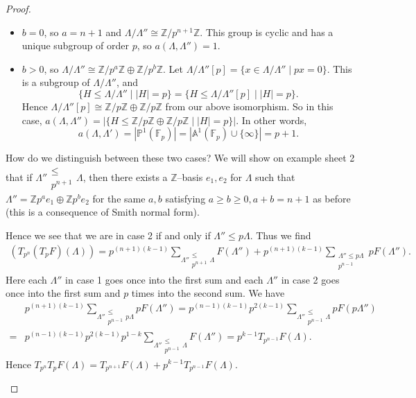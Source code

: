 \documentclass{article}
\theoremstyle{definition}
\begin{document}
\begin{proof}
\begin{enumerate}[(1)]
        \begin{itemize}
            \item $b = 0$, so $a = n+1$ and $\Lambda/\Lambda'' \cong \mathbb{Z}/p^{n+1}\mathbb{Z}$. This group is cyclic and has a unique subgroup of order $p$, so $a(\Lambda,\Lambda'') = 1$.
            \item $b>0$, so $\Lambda/\Lambda'' \cong \mathbb{Z}/p^a \mathbb{Z} \oplus \mathbb{Z}/p^b \mathbb{Z}$. Let $\Lambda/\Lambda''[p] = \{x \in \Lambda/\Lambda'' \mid px = 0\}$. This is a subgroup of $\Lambda/\Lambda''$, and \[
            \{H \le \Lambda/\Lambda'' \mid |H| = p\}  = \{H \le \Lambda/\Lambda''[p] \mid  |H| = p\}.
            \]
            Hence $\Lambda/\Lambda''[p] \cong \mathbb{Z}/p\mathbb{Z} \oplus \mathbb{Z}/p\mathbb{Z}$ from our above isomorphism. So in this case, $a(\Lambda,\Lambda'')  = |\{H \le \mathbb{Z}/p\mathbb{Z} \oplus \mathbb{Z}/p\mathbb{Z} \mid |H|= p\}|$. In other words, \[
            a(\Lambda,\Lambda') = |\mathbb{P}^1(\mathbb{F}_p)| = |\mathbb{A}^1(\mathbb{F}_p) \cup \{\infty\}| = p+1.
            \]
        \end{itemize} 
        How do we distinguish between these two cases? We will show on example sheet 2 that if $\Lambda'' \substack{\le \\ p^{n+1}}\Lambda$, then there exists a $\mathbb{Z}$--basis $e_1, e_2$ for $\Lambda$ such that $\Lambda'' = \mathbb{Z}p^a e_1 \oplus \mathbb{Z} p^b e_2$ for the same $a,b$ satisfying $a\ge b\ge 0, a+b = n+1$ as before (this is a consequence of Smith normal form).
        \vspace{1mm}
         
        Hence we see that we are in case 2 if and only if $\Lambda'' \le p \Lambda$. Thus we find
        \begin{align*}
            (T_{p^n}(T_pF)(\Lambda)) = p^{(n+1)(k-1)}\sum_{\Lambda'' \substack{\le \\ p^{n+1}}\Lambda} F(\Lambda'') + p^{(n+1)(k-1)} \sum_{\substack{ \Lambda''\le p \Lambda\\p^{n-1} } }^{} pF(\Lambda'').
        \end{align*}
        Here each $\Lambda''$ in case 1 goes once into the first sum and each $\Lambda''$ in case 2 goes once into the first sum and $p$ times into the second sum. We have 
        \begin{align*}
            &p^{(n+1)(k-1)} \sum_{\Lambda'' \substack{\le \\p^{n-1}} p \Lambda} p F(\Lambda'') = p^{(n-1)(k-1)}p^{2(k-1)}\sum_{\Lambda'' \substack{\le \\ p^{n-1}}\Lambda} p F(p \Lambda'') \\
            =& p^{(n-1)(k-1)}p^{2(k-1)}p^{1-k}\sum_{\Lambda'' \substack{\le \\ p^{n-1}}\Lambda} F(\Lambda'') = p^{k-1}T_{p^{n-1}}F(\Lambda).
        \end{align*}
        Hence $T_{p^n}T_p F(\Lambda) = T_{p^{n+1}}F(\Lambda) + p^{k-1} T_{p^{n-1}}F(\Lambda)$.
    \end{enumerate}
\end{proof}
\end{document}
